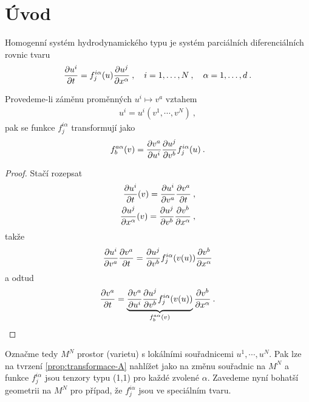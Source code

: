 \section{Úvod}

\begin{definition}
    Homogenní systém hydrodynamického typu je systém parciálních diferenciálních rovnic tvaru
    \begin{align}
        \frac{\partial u^i}{\partial t} = f_j^{i \alpha} (u) \frac{\partial u^j}{\partial x^\alpha} \:, \quad 
        i = 1, \dots , N \:, \quad \alpha = 1, \dots , d \:.
    \end{align}
\end{definition}

\begin{proposition} \label{prop:transformace-A} 
    Provedeme-li záměnu proměnných $u^i \mapsto v^a$ vztahem
    \begin{align}
        u^i = u^i(v^1,\cdots, v^N) \:,
    \end{align}
    pak se funkce $f^{i\alpha}_{j}$ transformují jako
    \begin{align}
        f^{a \alpha}_{b}(v) = \frac{\partial v^a}{\partial u^i} \frac{\partial u^j}{\partial v^b} f^{i \alpha}_j (u) \:.
    \end{align}
\end{proposition}
\begin{proof}
    Stačí rozepsat
    \begin{align}
        \frac{\partial u^i}{\partial t}(v) = \frac{\partial u^i}{\partial v^a} \frac{\partial v^a}{\partial t} \:, \\
        \frac{\partial u^j}{\partial x^\alpha}(v) = \frac{\partial u^j}{\partial v^b} \frac{\partial v^b}{\partial x^\alpha}\:,
    \end{align}
    takže
    \begin{align}
        \frac{\partial u^i}{\partial v^a} \frac{\partial v^a}{\partial t} = \frac{\partial u^j}{\partial v^b} f^{i \alpha}_j (v(u)) \frac{\partial v^b}{\partial x^\alpha}
    \end{align}
    a odtud
    \begin{align}
        \frac{\partial v^a}{\partial t} = \underbrace{\frac{\partial v^a}{\partial u^i} \frac{\partial u^j}{\partial v^b} f^{i \alpha}_j(v(u))}_{f^{a \alpha}_b(v)} \frac{\partial v^b}{\partial x^\alpha} \:.
    \end{align}
\end{proof}

Označme tedy $M^N$ prostor (varietu) s lokálními souřadnicemi $u^1,\cdots, u^N$. Pak lze na tvrzení \vref{prop:transformace-A} nahlížet jako na změnu souřadnic na $M^N$ a funkce $f^{i \alpha}_j$ jsou tenzory typu (1,1) pro každé zvolené $\alpha$. Zavedeme nyní bohatší geometrii na $M^N$ pro případ, že $f^{i  \alpha}_j$ jsou ve speciálním tvaru.

